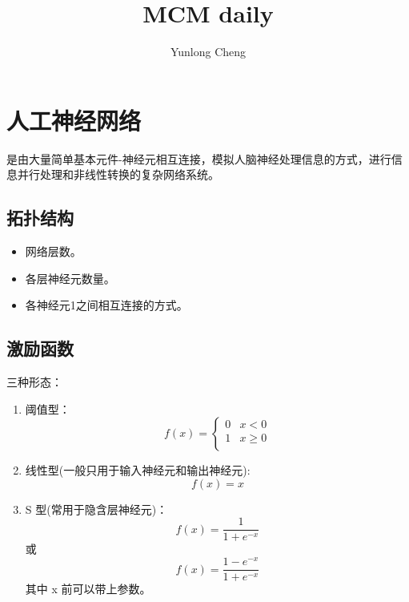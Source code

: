 \documentclass[12pt,a4paper]{article}
\title{MCM daily}
\author{Yunlong Cheng}
\begin{document}
\maketitle
\section{人工神经网络}
是由大量简单基本元件-神经元相互连接，模拟人脑神经处理信息的方式，进行信息并行处理和非线性转换的复杂网络系统。
\subsection{拓扑结构}
\begin{itemize}
  \item 网络层数。
  \item 各层神经元数量。
  \item 各神经元1之间相互连接的方式。
\end{itemize}
\subsection{激励函数}
三种形态：
\begin{enumerate}
  \item 阈值型：
  \begin{equation*}
    f(x) =
    \begin{cases}
      0 & x<0\\
      1 & x\ge 0 \\
    \end{cases}
  \end{equation*}
  \item 线性型(一般只用于输入神经元和输出神经元):$$f(x) = x$$
  \item S 型(常用于隐含层神经元)：
    $$f(x) = \frac{1}{1+e^{-x}}$$ 或 $$f(x) = \frac{1-e^{-x}}{1+e^{-x}}$$
    其中 x 前可以带上参数。
\end{enumerate}
\end{document}
